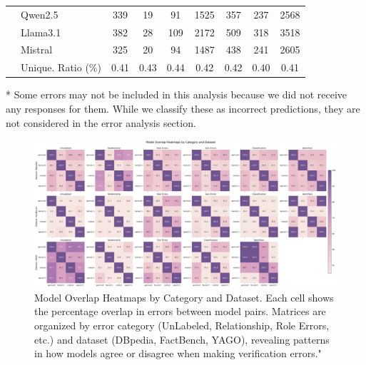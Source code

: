 \begin{table}[ht!]
{\begin{threeparttable}
\begin{tabular}{llcccccc||c}
                                        & Qwen2.5                            & 339      & 19    & 91  & 1525    & 357   & 237   & 2568 \\
                                        & Llama3.1                           & 382      & 28    & 109 & 2172    & 509   & 318   & 3518 \\
                                        & Mistral                            & 325      & 20    & 94  & 1487    & 438   & 241   & 2605 \\ \cline{2-9}
                                        & Unique. Ratio (\%)                 & 0.41     & 0.43  & 0.44 & 0.42   & 0.42  & 0.40  & 0.41 \\
            \bottomrule
        \end{tabular}
    \begin{tablenotes}
         \item[*] Some errors may not be included in this analysis because we did not receive any responses for them. While we classify these as incorrect predictions, they are not considered in the error analysis section.
    \end{tablenotes}
    \end{threeparttable}}
    \label{tab:error_results-full-wo-category-all-datasets}
\end{table}

\begin{figure}[ht!]
    \centering
    \begin{minipage}[b]{\textwidth}
        \centering
        \includegraphics[width=\textwidth]{res/overlap_heatmaps_by_dataset}
    \end{minipage}
    \caption{Model Overlap Heatmaps by Category and Dataset. Each cell shows the percentage overlap in errors between model pairs. Matrices are organized by error category (UnLabeled, Relationship, Role Errors, etc.) and dataset (DBpedia, FactBench, YAGO), revealing patterns in how models agree or disagree when making verification errors."}
    \label{fig:overlap_heatmaps_by_dataset}
\end{figure}

